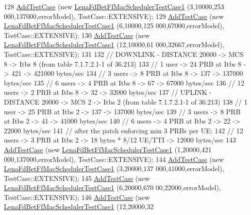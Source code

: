 \begin{DoxyCode}
128   \hyperlink{classns3_1_1TestCase_a3718088e3eefd5d6454569d2e0ddd835}{AddTestCase} (\textcolor{keyword}{new} \hyperlink{classLenaFdBetFfMacSchedulerTestCase1}{LenaFdBetFfMacSchedulerTestCase1} (3,10000,253
      000,137000,errorModel), TestCase::EXTENSIVE);
129   \hyperlink{classns3_1_1TestCase_a3718088e3eefd5d6454569d2e0ddd835}{AddTestCase} (\textcolor{keyword}{new} \hyperlink{classLenaFdBetFfMacSchedulerTestCase1}{LenaFdBetFfMacSchedulerTestCase1} (6,10000,125
      000,67000,errorModel), TestCase::EXTENSIVE);
130   \hyperlink{classns3_1_1TestCase_a3718088e3eefd5d6454569d2e0ddd835}{AddTestCase} (\textcolor{keyword}{new} \hyperlink{classLenaFdBetFfMacSchedulerTestCase1}{LenaFdBetFfMacSchedulerTestCase1} (12,10000,61
      000,32667,errorModel), TestCase::EXTENSIVE);
131 
132   \textcolor{comment}{// DOWNLINK - DISTANCE 20000 -> MCS 8 -> Itbs 8 (from table 7.1.7.2.1-1 of 36.213)}
133   \textcolor{comment}{// 1 user -> 24 PRB at Itbs 8 -> 421 -> 421000 bytes/sec}
134   \textcolor{comment}{// 3 users -> 8 PRB at Itbs 8 -> 137 -> 137000 bytes/sec}
135   \textcolor{comment}{// 6 users -> 4 PRB at Itbs 8 -> 67 -> 67000 bytes/sec}
136   \textcolor{comment}{// 12 users -> 2 PRB at Itbs 8 -> 32 -> 32000 bytes/sec}
137   \textcolor{comment}{// UPLINK - DISTANCE 20000 -> MCS 2 -> Itbs 2 (from table 7.1.7.2.1-1 of 36.213)}
138   \textcolor{comment}{// 1 user -> 25 PRB at Itbs 2 -> 137 -> 137000 bytes/sec}
139   \textcolor{comment}{// 3 users -> 8 PRB at Itbs 2 -> 41 -> 41000 bytes/sec}
140   \textcolor{comment}{// 6 users -> 4 PRB at Itbs 2 -> 22 -> 22000 bytes/sec}
141   \textcolor{comment}{// after the patch enforcing min 3 PRBs per UE:}
142   \textcolor{comment}{// 12 users -> 3 PRB at Itbs 2 -> 18 bytes * 8/12 UE/TTI -> 12000 bytes/sec}
143   \hyperlink{classns3_1_1TestCase_a3718088e3eefd5d6454569d2e0ddd835}{AddTestCase} (\textcolor{keyword}{new} \hyperlink{classLenaFdBetFfMacSchedulerTestCase1}{LenaFdBetFfMacSchedulerTestCase1} (1,20000,421
      000,137000,errorModel), TestCase::EXTENSIVE);
144   \hyperlink{classns3_1_1TestCase_a3718088e3eefd5d6454569d2e0ddd835}{AddTestCase} (\textcolor{keyword}{new} \hyperlink{classLenaFdBetFfMacSchedulerTestCase1}{LenaFdBetFfMacSchedulerTestCase1} (3,20000,137
      000,41000,errorModel), TestCase::EXTENSIVE);
145   \hyperlink{classns3_1_1TestCase_a3718088e3eefd5d6454569d2e0ddd835}{AddTestCase} (\textcolor{keyword}{new} \hyperlink{classLenaFdBetFfMacSchedulerTestCase1}{LenaFdBetFfMacSchedulerTestCase1} (6,20000,670
      00,22000,errorModel), TestCase::EXTENSIVE);
146   \hyperlink{classns3_1_1TestCase_a3718088e3eefd5d6454569d2e0ddd835}{AddTestCase} (\textcolor{keyword}{new} \hyperlink{classLenaFdBetFfMacSchedulerTestCase1}{LenaFdBetFfMacSchedulerTestCase1} (12,20000,32

\end{DoxyCode}
